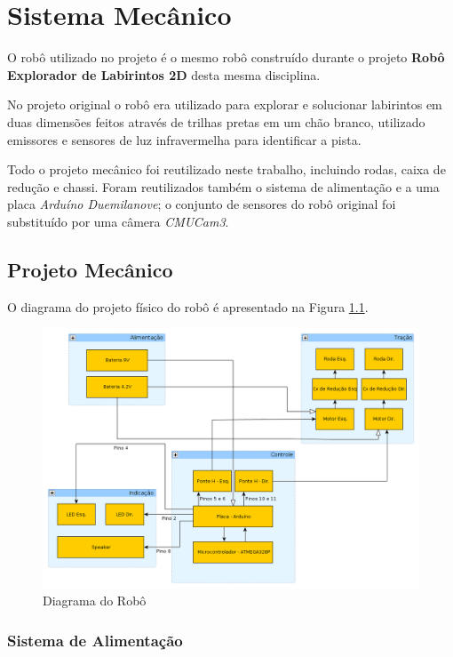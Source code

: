 \chapter{Sistema Mecânico}

O robô utilizado no projeto é o mesmo robô construído durante o projeto \textbf{Robô Explorador de Labirintos 2D} \cite{RoboExplorador} desta mesma disciplina.

No projeto original o robô era utilizado para explorar e solucionar labirintos em duas dimensões feitos através de trilhas pretas em um chão branco, utilizado emissores e sensores de luz infravermelha para identificar a pista. 

Todo o projeto mecânico foi reutilizado neste trabalho, incluindo rodas, caixa de redução e chassi. Foram reutilizados também o sistema de alimentação e a uma placa \textit{Arduíno Duemilanove}; o conjunto de sensores do robô original foi substituído por uma câmera \textit{CMUCam3}.

\section{Projeto Mecânico}

O diagrama do projeto físico do robô é apresentado na Figura \ref{int_fig01}.

\begin{figure}[h!]
    \center
    \includegraphics[scale=0.3]{imagens/robo.png}
    \caption{Diagrama do Robô}
    \label{int_fig01}
\end{figure}

\subsection{Sistema de Alimentação}

